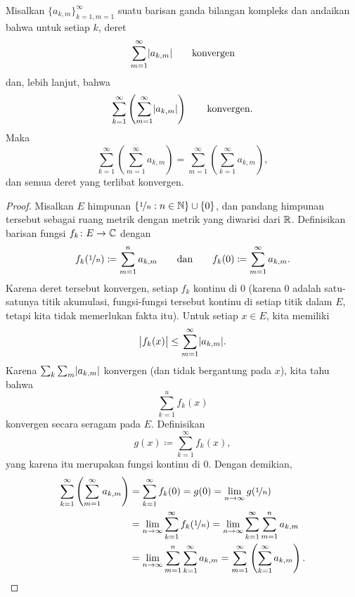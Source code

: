 \begin{thm} \label{thm:fubiniforsums}
Misalkan $\{ a_{k,m} \}_{k=1,m=1}^\infty$ suatu barisan ganda
bilangan kompleks dan andaikan bahwa untuk setiap $k$, deret
\begin{equation*}
\sum_{m=1}^\infty \lvert {a_{k,m}} \rvert \qquad \text{konvergen}
\end{equation*}
dan, lebih lanjut, bahwa
\begin{equation*}
\sum_{k=1}^\infty \left( \sum_{m=1}^\infty \lvert {a_{k,m}} \rvert \right)
\qquad \text{konvergen}.
\end{equation*}
Maka
\begin{equation*}
\sum_{k=1}^\infty \left( \sum_{m=1}^\infty a_{k,m} \right)
=
\sum_{m=1}^\infty \left( \sum_{k=1}^\infty a_{k,m} \right) ,
\end{equation*}
dan semua deret yang terlibat konvergen.
\end{thm}

\begin{proof}
Misalkan $E$ himpunan $\{ \nicefrac{1}{n} : n \in {\mathbb{N}} \} \cup \{ 0 \}$,
dan pandang himpunan tersebut sebagai ruang metrik dengan metrik yang diwarisi dari ${\mathbb{R}}$.
Definisikan barisan fungsi $f_k \colon E \to {\mathbb{C}}$
dengan
\begin{equation*}
f_k(\nicefrac{1}{n}) \coloneqq \sum_{m=1}^n a_{k,m}
\qquad
\text{dan}
\qquad
f_k(0) \coloneqq \sum_{m=1}^\infty a_{k,m} .
\end{equation*}
Karena deret tersebut konvergen, setiap $f_k$ kontinu di $0$
(karena 0 adalah satu-satunya titik akumulasi, fungsi-fungsi tersebut kontinu di setiap titik
dalam $E$, tetapi kita tidak memerlukan fakta itu).
Untuk setiap $x \in E$, kita memiliki
\begin{equation*}
\bigl\lvert {f_k(x)} \bigr\rvert \leq \sum_{m=1}^\infty \lvert {a_{k,m}} \rvert .
\end{equation*}
Karena $\sum_k \sum_m \lvert {a_{k,m}} \rvert$ konvergen (dan tidak bergantung pada
$x$), kita tahu bahwa
\begin{equation*}
\sum_{k=1}^n f_k(x)
\end{equation*}
konvergen secara seragam pada $E$.  Definisikan
\begin{equation*}
g(x) \coloneqq \sum_{k=1}^\infty f_k(x) ,
\end{equation*}
yang karena itu merupakan fungsi kontinu di $0$.
Dengan demikian,
\begin{equation*}
\begin{split}
\sum_{k=1}^\infty \left( \sum_{m=1}^\infty a_{k,m} \right)
& =
\sum_{k=1}^\infty f_k(0)
= g(0)
= \lim_{n\to\infty} g(\nicefrac{1}{n}) \\
&= 
\lim_{n\to\infty}\sum_{k=1}^\infty f_k(\nicefrac{1}{n})
= 
\lim_{n\to\infty}\sum_{k=1}^\infty \sum_{m=1}^n a_{k,m} \\
&= 
\lim_{n\to\infty}\sum_{m=1}^n \sum_{k=1}^\infty a_{k,m}
= 
\sum_{m=1}^\infty \left( \sum_{k=1}^\infty a_{k,m} \right) . \qedhere
\end{split}
\end{equation*}
\end{proof}

